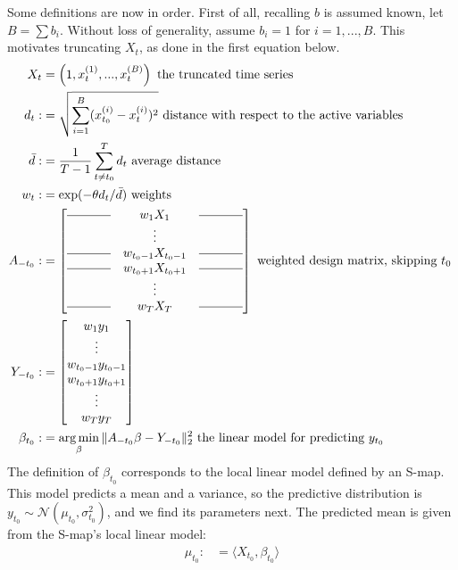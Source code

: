 \documentclass{article}
\theoremstyle{definition}
\newcommand{\tp}[1]{^{(#1)}}
\newcommand{\vecline}{\rule[.5ex]{3.5em}{0.4pt}}
\DeclareMathOperator*{\argmin}{arg\,min}
\begin{document}
Some definitions are now in order. First of all, recalling $b$ is
assumed known, let $B = \sum b_i$. Without loss of generality, assume
$b_i = 1$ for $i=1,...,B$. This motivates truncating $X_t$, as done in the
first equation below.
\begin{align*}
  X_t &= \left (1, x_t\tp1,...,x_t\tp{B} \right )
  \text{ the truncated time series }\\
  d_t :&= \sqrt{ \sum_{i=1}^B (x_{t_0}\tp{i} - x_t\tp{i} )^2 }
  \text{ distance with respect to the active variables }\\
  \bar{d} :&= \frac{1}{T-1}\sum_{t \neq t_0}^T d_t
  \text{ average distance } \\
  w_t :& = \exp ( -\theta d_t / \bar{d} )
  \text{ weights }\\
  A_{-t_0} :&=
  \begin{bmatrix}
    \vecline  & w_1X_1       & \vecline \\
              & \vdots       &          \\
    \vecline  & w_{t_0-1}X_{t_0-1} & \vecline \\
    \vecline  & w_{t_0+1}X_{t_0+1} & \vecline \\
              & \vdots       &          \\
    \vecline  & w_TX_T       & \vecline 
  \end{bmatrix}
  \text{ weighted design matrix, skipping $t_0$ } \\
  Y_{-t_0} :&=
  \begin{bmatrix}
    w_1y_1 \\
    \vdots \\
    w_{t_0-1}y_{t_0-1} \\
    w_{t_0+1}y_{t_0+1} \\
    \vdots \\
    w_Ty_T 
  \end{bmatrix}\\
  \beta_{t_0} :&= \argmin_\beta \| A_{-t_0} \beta - Y_{-t_0}\|_2^2 \text{ the linear model for predicting $y_{t_0}$ }
\end{align*}
The definition of $\beta_{t_0}$ corresponds to the local linear model
defined by an S-map. This model predicts a mean and a variance, so the
predictive distribution is $y_{t_0} \sim \mathcal{N}(\mu_{t_0},\sigma^2_{t_0})$,
and we find its parameters next. The predicted mean is given from the
S-map's local linear model:
\begin{align*}
  \mu_{t_0} :&= \langle X_{t_0}, \beta_{t_0} \rangle
\end{align*}
\end{document}
